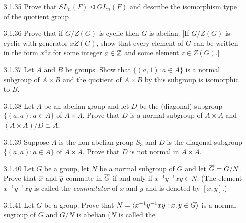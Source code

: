 \begin{enumerate}
\begin{enumerate}
                  \end{enumerate}
   \item[3.1.35]  Prove that $SL_n(F) \trianglelefteq GL_n(F)$ and describe the
                  isomorphism type of the quotient group.
   \item[3.1.36]  Prove that if $G/Z(G)$ is cyclic then $G$ is abelian. [If
                  $G/Z(G)$ is cyclic with generator $xZ(G)$, show that every
                  element of $G$ can be written in the form $x^az$ for some
                  integer $a \in \mathbb{Z}$ and some element $z \in Z(G)$.]
   \item[3.1.37]  Let $A$ and $B$ be groups. Show that $\{(a, 1) : a \in A\}$ is
                  a normal subgroup of $A \times B$ and the quotient of
                  $A \times B$ by this subgroup is isomorphic to $B$.
   \item[3.1.38]  Let $A$ be an abelian group and let $D$ be the (diagonal)
                  subgroup $\{(a, a) : a \in A\}$ of $A \times A$. Prove that
                  $D$ is a normal subgroup of $A \times A$ and
                  $(A \times A)/D \cong A$.
   \item[3.1.39]  Suppose $A$ is the non-abelian group $S_3$ and $D$ is the
                  diagonal subgroup $\{(a, a) : a \in A\}$ of $A \times A$.
                  Prove that $D$ is not normal in $A \times A$.
   \item[3.1.40]  Let $G$ be a group, let $N$ be a normal subgroup of $G$ and
                  let $\overline{G} = G/N$. Prove that $\overline{x}$ and $\overline{y}$ commute in
                  $\overline{G}$ if and only if $x^{-1}y^{-1}xy \in N$. (The element
                  $x^{-1}y^{-1}xy$ is called the \textit{commutator} of $x$ and
                  $y$ and is denoted by $[x, y]$.)
   \item[3.1.41]  Let $G$ be a group. Prove that
                  $N = \langle x^{-1}y^{-1}xy : x, y \in G \rangle$ is a normal sugroup of
                  $G$ and $G/N$ is abelian ($N$ is called the

\end{enumerate}

